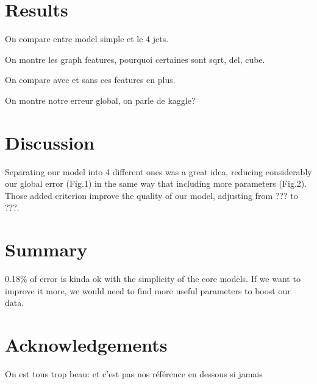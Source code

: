 \documentclass[10pt,conference,compsocconf]{IEEEtran}
\begin{document}
\section{Results}
On compare entre model simple et le 4 jets.

On montre les graph features, pourquoi certaines sont sqrt, del, cube.

On compare avec et sans ces features en plus.

On montre notre erreur global, on parle de kaggle?



\section{Discussion}

Separating our model into 4 different ones was a great idea, reducing considerably our global error (Fig.1) in the same way that including more parameters (Fig.2). Those added criterion improve the quality of our model, adjusting from ??? to ???.    



\section{Summary}
	0.18\% of error is kinda ok with the simplicity of the core models. If we want to improve it more, we would need to find more useful parameters to boost our data.

\section*{Acknowledgements}
On est tous trop beau: et c'est pas nos r\'ef\'erence en dessous si jamais



\end{document}
